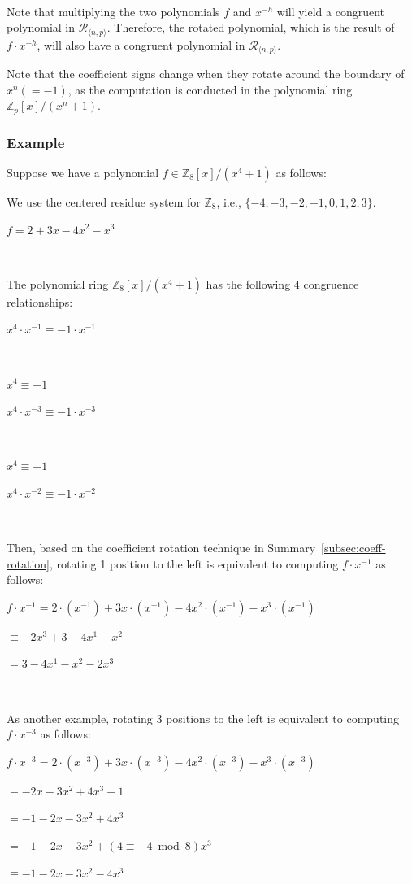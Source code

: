 $ $

Note that multiplying the two polynomials $f$ and $x^{-h}$ will yield a congruent polynomial in $\mathcal{R}_{\langle n, p \rangle}$. Therefore, the rotated polynomial, which is the result of $f \cdot x^{-h}$, will also have a congruent polynomial in $\mathcal{R}_{\langle n, p \rangle}$. 

Note that the coefficient signs change when they rotate around the boundary of $x^n (= -1)$, as the computation is conducted in the polynomial ring $\mathbb{Z}_p[x] / (x^n + 1)$.




\subsubsection{Example}
\label{subsec:coeff-rotation-ex}

Suppose we have a polynomial $f \in \mathbb{Z}_8[x] / (x^4 + 1)$ as follows:

We use the centered residue system for $\mathbb{Z}_8$, i.e., $\{-4,-3,-2,-1,0,1,2,3\}$.

$f = 2 + 3x - 4x^2 -x^3$




$ $

The polynomial ring $\mathbb{Z}_8[x] / (x^4 + 1)$ has the following 4 congruence relationships: 

{}

$x^4 \cdot x^{-1} \equiv -1 \cdot x^{-1}$

{}

$ $

$x^4 \equiv -1$

$x^4 \cdot x^{-3} \equiv -1 \cdot x^{-3}$

{}

$ $

$x^4 \equiv -1$

$x^4 \cdot x^{-2} \equiv -1 \cdot x^{-2}$

{}

$ $



Then, based on the coefficient rotation technique in Summary~\ref*{subsec:coeff-rotation}, rotating 1 position to the left is equivalent to computing $f \cdot x^{-1}$ as follows:

$f\cdot x^{-1} = 2\cdot(x^{-1}) + 3x\cdot(x^{-1}) - 4x^2\cdot(x^{-1}) - x^3\cdot(x^{-1})$

$\equiv -2x^{3} + 3 - 4x^1 - x^2$

$= 3 - 4x^1 - x^2 -2x^{3}$

$ $

As another example, rotating 3 positions to the left is equivalent to computing $f \cdot x^{-3}$ as follows:

$f\cdot x^{-3} = 2\cdot(x^{-3}) + 3x\cdot(x^{-3}) - 4x^2\cdot(x^{-3}) - x^3\cdot(x^{-3})$

$\equiv -2x - 3x^2 + 4x^3 - 1$

$= -1 - 2x - 3x^2 + 4x^3$

$= -1 - 2x - 3x^2 + (4 \equiv -4 \bmod 8) x^3$

$\equiv -1 - 2x - 3x^2 -4x^3$